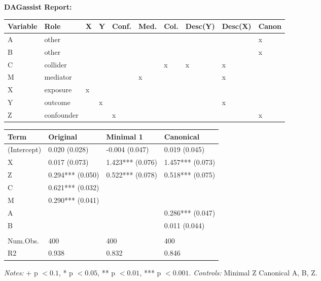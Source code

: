 \begingroup\footnotesize
\setlength{\LTleft}{0pt}\setlength{\LTright}{0pt}
\setlength{\tabcolsep}{4pt}
\renewcommand{\arraystretch}{0.95}
\setlength{\aboverulesep}{0pt}\setlength{\belowrulesep}{0pt}
\begin{center}\textbf{DAGassist Report:}\end{center}
\begin{center}
\setlength{\LTleft}{0pt}\setlength{\LTright}{0pt}
\begin{longtable}{@{}l l l l l l l l l l@{}}
\toprule
Variable & Role & X & Y & Conf. & Med. & Col. & Desc(Y) & Desc(X) & Canon \\
\midrule
{A} & {other} &  &  &  &  &  &  &  & {x} \\
{B} & {other} &  &  &  &  &  &  &  & {x} \\
{C} & {collider} &  &  &  &  & {x} & {x} & {x} &  \\
{M} & {mediator} &  &  &  & {x} &  &  & {x} &  \\
{X} & {exposure} & {x} &  &  &  &  &  &  &  \\
{Y} & {outcome} &  & {x} &  &  &  &  & {x} &  \\
{Z} & {confounder} &  &  & {x} &  &  &  &  & {x} \\
\bottomrule
\end{longtable}
\end{center}
\vspace{-6pt}
\begin{center}
\setlength{\LTleft}{0pt}\setlength{\LTright}{0pt}
\begin{longtable}{@{}l l l l@{}}
\toprule
Term & Original & Minimal 1 & Canonical \\
\midrule
{\textnormal{(Intercept)}} & {0.020 (0.028)} & {-0.004 (0.047)} & {0.019 (0.045)} \\
{\textnormal{X}} & {0.017 (0.073)} & {1.423*** (0.076)} & {1.457*** (0.073)} \\
{\textnormal{Z}} & {0.294*** (0.050)} & {0.522*** (0.078)} & {0.518*** (0.075)} \\
{\textnormal{C}} & {0.621*** (0.032)} &  &  \\
{\textnormal{M}} & {0.290*** (0.041)} &  &  \\
{\textnormal{A}} &  &  & {0.286*** (0.047)} \\
{\textnormal{B}} &  &  & {0.011 (0.044)} \\
 &  &  &  \\
{\textnormal{Num.Obs.}} & {400} & {400} & {400} \\
{\textnormal{R2}} & {0.938} & {0.832} & {0.846} \\
\bottomrule
\end{longtable}
\end{center}
{\footnotesize \emph{Notes:} + p $< 0.1$, * p $< 0.05$, ** p $< 0.01$, *** p $< 0.001$. \; \textit{Controls:} Minimal {Z} \; Canonical {A, B, Z}.}
\endgroup
